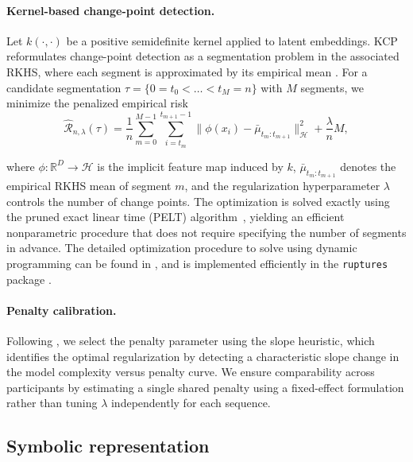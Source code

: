 \documentclass[runningheads]{llncs}
\begin{document}
        \paragraph{Kernel-based change-point detection.}

        Let $k(\cdot,\cdot)$ be a positive semidefinite kernel applied to latent embeddings. KCP reformulates change-point detection as a segmentation problem in the associated RKHS, where each segment is approximated by its empirical mean \cite{4301363,cpt,garreau2018consistent}. For a candidate segmentation $\tau = \{0=t_0 < \dots < t_M=n\}$ with $M$ segments, we minimize the penalized empirical risk
        \begin{equation}
        \label{eq:opti}
        \hat{\mathcal{R}}_{n,\lambda}(\tau)
        =
        \frac{1}{n} \sum_{m=0}^{M-1} \sum_{i=t_m}^{t_{m+1}-1}
        \big\| \phi(x_i) - \bar{\mu}_{t_m:t_{m+1}} \big\|_{\mathcal{H}}^2
        + \frac{\lambda}{n} M,
        \end{equation}

        where $\phi: \mathbb{R}^D \to \mathcal{H}$ is the implicit feature map induced by $k$, $\bar{\mu}_{t_m:t_{m+1}}$ denotes the empirical RKHS mean of segment $m$, and the regularization hyperparameter $\lambda$ controls the number of change points. The optimization is solved exactly using the pruned exact linear time (PELT) algorithm~\cite{pelt}, yielding an efficient nonparametric procedure that does not require specifying the number of segments in advance. The detailed optimization procedure to solve  using dynamic programming can be found in \cite{cpt}, and is implemented efficiently in the \texttt{ruptures} package \cite{ruptures}. 

        \paragraph{Penalty calibration.} Following \cite{cpt,CELISSE2018200,slop_heuristics_survey}, we select the penalty parameter using the slope heuristic, which identifies the optimal regularization by detecting a characteristic slope change in the model complexity versus penalty curve. We ensure comparability across participants by estimating a single shared penalty using a fixed-effect formulation rather than tuning $\lambda$ independently for each sequence.
    \vspace{-0.2cm}
    \subsection{Symbolic representation}
        \label{sec:chapter_5_symbolic_representation}
\end{document}

